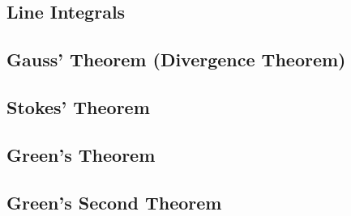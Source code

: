 \subsection*{Line Integrals}

\subsection*{Gauss' Theorem (Divergence Theorem)}
\subsection*{Stokes' Theorem}
\subsection*{Green's Theorem}
\subsection*{Green's Second Theorem}
